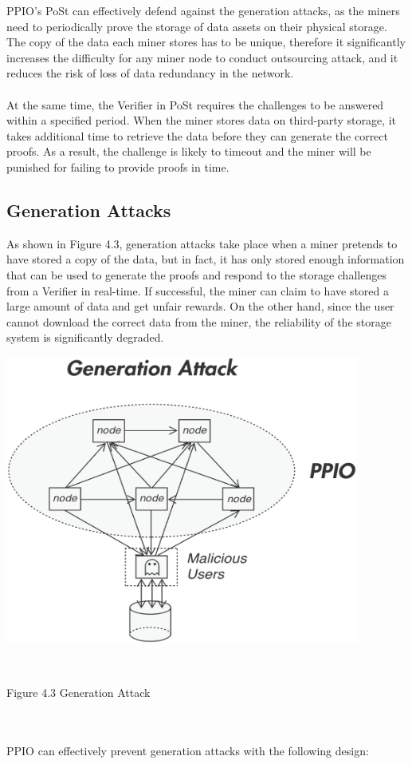 \documentclass[10pt,a4paper]{article}
\begin{document}
\noindent   
PPIO’s PoSt can effectively defend against the generation attacks, as the miners need to periodically prove the storage of data assets on their physical storage. The copy of the data each miner stores has to be unique, therefore it significantly increases the difficulty for any miner node to conduct outsourcing attack, and it reduces the risk of loss of data redundancy in the network.
   \vspace{-0.5em}
\\\\At the same time, the Verifier in PoSt requires the challenges to be answered within a specified period. When the miner stores data on third-party storage, it takes additional time to retrieve the data before they can generate the correct proofs. As a result, the challenge is likely to timeout and the miner will be punished for failing to provide proofs in time.
   \vspace{-0.5em}
      \subsection{Generation Attacks}  %
As shown in Figure 4.3, generation attacks take place when a miner pretends to have stored a copy of the data, but in fact, it has only stored enough information that can be used to generate the proofs and respond to the storage challenges from a Verifier in real-time. If successful, the miner can claim to have stored a large amount of data and get unfair rewards. On the other hand, since the user cannot download the correct data from the miner, the reliability of the storage system is significantly degraded.
   \vspace{-2.5em}
\\ \centerline{\includegraphics[width=330pt]{fig17}}
\\ \centerline{{Figure 4.3 Generation Attack}}
   \vspace{-1.5em}
\\\\
PPIO can effectively prevent generation attacks with the following design:
   \vspace{-0.8em}
\\
\end{document}
